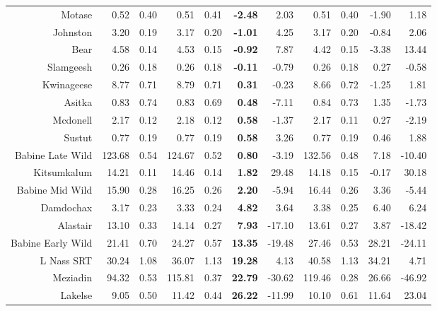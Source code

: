 \documentclass[french,11pt]{book}
\begin{document}
\begin{longtable}[t]{rrrrr>{}rrrrrr}
\midrule Motase & 0.52 & 0.40 & 0.51 & 0.41 & \textbf{-2.48} & 2.03 & 0.51 & 0.40 & -1.90 & 1.18\\ Johnston & 3.20 & 0.19 & 3.17 & 0.20 & \textbf{-1.01} & 4.25 & 3.17 & 0.20 & -0.84 & 2.06\\ Bear & 4.58 & 0.14 & 4.53 & 0.15 & \textbf{-0.92} & 7.87 & 4.42 & 0.15 & -3.38 & 13.44\\ Slamgeesh & 0.26 & 0.18 & 0.26 & 0.18 & \textbf{-0.11} & -0.79 & 0.26 & 0.18 & 0.27 & -0.58\\ Kwinageese & 8.77 & 0.71 & 8.79 & 0.71 & \textbf{0.31} & -0.23 & 8.66 & 0.72 & -1.25 & 1.81\\ Asitka & 0.83 & 0.74 & 0.83 & 0.69 & \textbf{0.48} & -7.11 & 0.84 & 0.73 & 1.35 & -1.73\\ Mcdonell & 2.17 & 0.12 & 2.18 & 0.12 & \textbf{0.58} & -1.37 & 2.17 & 0.11 & 0.27 & -2.19\\ Sustut & 0.77 & 0.19 & 0.77 & 0.19 & \textbf{0.58} & 3.26 & 0.77 & 0.19 & 0.46 & 1.88\\ Babine Late Wild & 123.68 & 0.54 & 124.67 & 0.52 & \textbf{0.80} & -3.19 & 132.56 & 0.48 & 7.18 & -10.40\\ Kitsumkalum & 14.21 & 0.11 & 14.46 & 0.14 & \textbf{1.82} & 29.48 & 14.18 & 0.15 & -0.17 & 30.18\\ Babine Mid Wild & 15.90 & 0.28 & 16.25 & 0.26 & \textbf{2.20} & -5.94 & 16.44 & 0.26 & 3.36 & -5.44\\ Damdochax & 3.17 & 0.23 & 3.33 & 0.24 & \textbf{4.82} & 3.64 & 3.38 & 0.25 & 6.40 & 6.24\\
\midrule Alastair & 13.10 & 0.33 & 14.14 & 0.27 & \textbf{7.93} & -17.10 & 13.61 & 0.27 & 3.87 & -18.42\\ Babine Early Wild & 21.41 & 0.70 & 24.27 & 0.57 & \textbf{13.35} & -19.48 & 27.46 & 0.53 & 28.21 & -24.11\\ L Nass SRT & 30.24 & 1.08 & 36.07 & 1.13 & \textbf{19.28} & 4.13 & 40.58 & 1.13 & 34.21 & 4.71\\ Meziadin & 94.32 & 0.53 & 115.81 & 0.37 & \textbf{22.79} & -30.62 & 119.46 & 0.28 & 26.66 & -46.92\\ Lakelse & 9.05 & 0.50 & 11.42 & 0.44 & \textbf{26.22} & -11.99 & 10.10 & 0.61 & 11.64 & 23.04\\* \end{longtable}

\endgroup{} \endgroup{}

\clearpage
\end{document}
